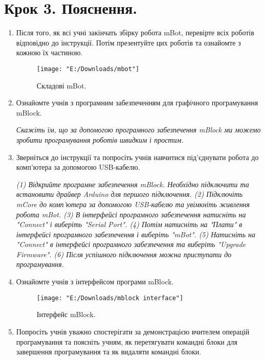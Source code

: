 \documentclass[12pt, a4paper]{article}
\begin{document}
	\section*{\textbf{Крок 3. Пояснення.}}
\begin{enumerate}
	\item Після того, як всі учні закінчать збірку робота mBot, перевірте всіх роботів відповідно до інструкції. Потім презентуйте цих роботів та ознайомте з кожною їх частиною.
	
	\begin{figure} [H]
		\centering
		\texttt{[image: "E:/Downloads/mbot"]}
		\caption[Складові mBot]{Складові mBot.}
		\label{fig:mbot}
	\end{figure}
	
	\item Ознайомте учнів з програмним забезпеченням для графічного програмування mBlock.
	
	\textit{Скажіть їм, що за допомогою програмного забезпечення mBlock ми можемо зробити програмування роботів швидким і простим.}

	\item Зверніться до інструкції та попросіть учнів навчитися під'єднувати робота до комп'ютера за допомогою USB-кабелю.
	
	\begin{multicols}{2}
	\textit{
		(1) Відкрийте програмне забезпечення mBlock. Необхідно підключити та встановити драйвер Arduino для першого підключення.
		(2) Підключіть mCore до комп'ютера за допомогою USB-кабелю та увімкніть живлення робота mBot.
		(3) В інтерфейсі програмного забезпечення натисніть на "Connect" і виберіть "Serial Port".
		(4) Потім натисніть на "Плати" в інтерфейсі програмного забезпечення і виберіть "mBot".
		(5) Натисніть на "Connect" в інтерфейсі програмного забезпечення та виберіть "Upgrade Firmware".
		(6) Після успішного підключення можна приступати до програмування.}
	\end{multicols}

	\item Ознайомте учнів з інтерфейсом програми mBlock.
	
		\begin{figure} [H]
		\centering
		\texttt{[image: "E:/Downloads/mblock interface"]}
		\caption[Інтерфейс mBlock]{Інтерфейс mBlock.}
		\label{fig:mblock-interface}
	\end{figure}
	
	\item Попросіть учнів уважно спостерігати за демонстрацією вчителем операцій програмування та поясніть учням, як перетягувати командні блоки для завершення програмування та як видаляти командні блоки.
	
\end{enumerate}
\end{document}
